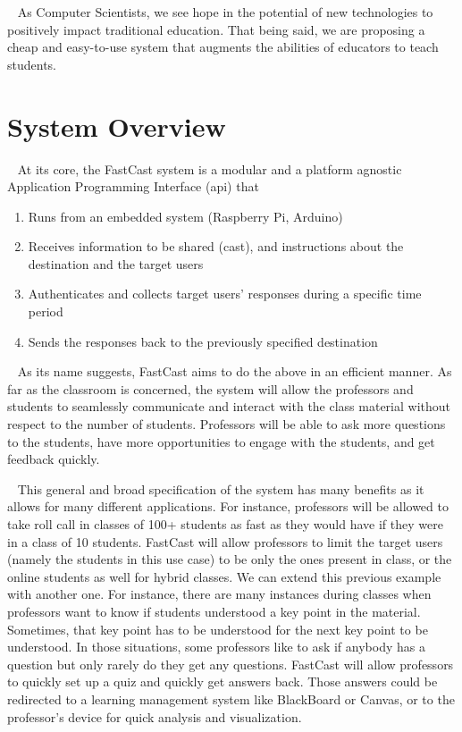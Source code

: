 \documentclass[10pt, a4paper]{article}
\begin{document}
\par ~ As Computer Scientists, we see hope in the potential of new technologies to positively impact traditional education. That being said, we are proposing a cheap and easy-to-use system that augments the abilities of educators to teach students.

\section{System Overview}
\par ~ At its core, the FastCast system is a modular and a platform agnostic Application Programming Interface (api) that
\begin{enumerate}
    \item Runs from an embedded system (Raspberry Pi, Arduino)
    \item Receives information to be shared (cast), and instructions about the destination and the target users
    \item Authenticates and collects target users' responses during a specific time period
    \item Sends the responses back to the previously specified destination
\end{enumerate}  

\par ~ As its name suggests, FastCast aims to do the above in an efficient manner. As far as the classroom is concerned, the system will allow the professors and students to seamlessly communicate and interact with the class material without respect to the number of students. Professors will be able to ask more questions to the students, have more opportunities to engage with the students, and get feedback quickly. 

\par ~ This general and broad specification of the system has many benefits as it allows for many different applications. For instance, professors will be allowed to take roll call in classes of 100+ students as fast as they would have if they were in a class of 10 students. FastCast will allow professors to limit the target users (namely the students in this use case) to be only the ones present in class, or the online students as well for hybrid classes. We can extend this previous example with another one. For instance, there are many instances during classes when professors want to know if students understood a key point in the material. Sometimes, that key point has to be understood for the next key point to be understood. In those situations, some professors like to ask if anybody has a question but only rarely do they get any questions. FastCast will allow professors to quickly set up a quiz and quickly get answers back. Those answers could be redirected to a learning management system like BlackBoard or Canvas, or to the professor's device for quick analysis and visualization.
\end{document}
